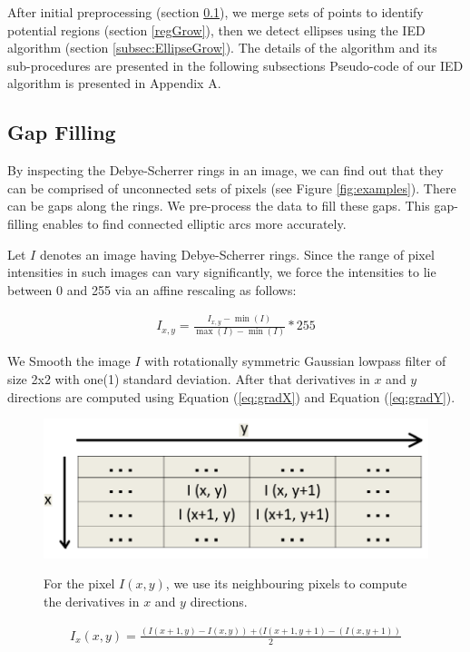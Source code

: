 \documentclass[preprint]{iucr}              %
\newcommand\dsrs{Debye-Scherrer rings}
\begin{document}
After initial pre\-processing (section \ref{sec:gapFilling}), we merge sets of
points to identify potential regions (section \ref{regGrow}), then we detect
ellipses using the IED algorithm (section \ref{subsec:EllipseGrow}).  
The details of the algorithm and its sub-procedures are presented in the
following subsections Pseudo-code of our IED algorithm is presented in Appendix
A.  

\subsection{Gap Filling} \label{sec:gapFilling}
By inspecting the \dsrs{} in an image, we can find out that they can be
comprised of unconnected sets of pixels (see Figure \ref{fig:examples}). 
There can be gaps along the rings.
We pre-process the data to fill these gaps.
This gap-filling enables to find connected elliptic arcs more accurately.

Let $I$ denotes an image having {\dsrs}.
Since the range of pixel intensities in such images can vary significantly, we
force the intensities to lie between 0 and 255 via an affine rescaling as
follows:  

\begin{align} \label{eq:affine}    
    I_{x,y} = \frac{I_{x,y} - \min(I)}{\max(I) - \min(I)} * 255    
\end{align}

We Smooth the image $I$ with rotationally symmetric Gaussian lowpass filter of
size 2x2 with one(1) standard deviation. 
After that derivatives in $x$ and $y$ directions are computed using Equation
(\ref{eq:gradX}) and Equation (\ref{eq:gradY}). 

\begin{figure}
\includegraphics[width=.45\linewidth]{Figures/Gradiant_Pixels_grid.png}
\label{fig:grid}
\caption{For the pixel $I(x,y)$, we use its neighbouring pixels to compute the
derivatives in $x$ and $y$ directions.} 
\end{figure}


\begin{align} \label{eq:gradX}
I_{x}(x,y) = \frac{(I(x+1,y)-I(x,y)) + (I(x+1,y+1)-(I(x,y+1))}{2}
\end{align}
\end{document}
